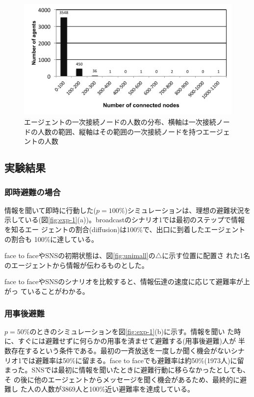\documentclass[a4j]{jarticle}
\begin{document}
\begin{figure}[t]
  \centering
  \includegraphics[width=\linewidth]{fig/number-of-friends.pdf}
\caption{エージェントの一次接続ノードの人数の分布、横軸は一次接続ノードの人数の範囲、縦軸はその範囲の一次接続ノードを持つエージェ
 ントの人数}
  \label{fig:friends-graph}
\end{figure}


\subsection{実験結果}
\subsubsection{即時避難の場合}
情報を聞いて即時に行動した($p=100\%$)シミュレーションは、理想の避難状況を
示している(図\ref{fig:exp-1}(a))。broadcastのシナリオ1では最初のステップで情報を知るエー
ジェントの割合(diffusion)は100\%で、出口に到着したエージェントの割合も
100\%に達している。

face to faceやSNSの初期状態は、図\ref{fig:unimall}の$\triangle$に示す位置に配置さ
れた1名のエージェントから情報が伝わるものとした。

face to faceやSNSのシナリオを比較すると、情報伝達の速度に応じて避難率が上がっ
ていることがわかる。

\subsubsection{用事後避難}
$p=50\%$のときのシミュレーションを図\ref{fig:exp-1}(b)に示す。情報を聞い
た時に、すぐには避難せずに何らかの用事を済ませて避難する(用事後避難)人が
半数存在するという条件である。最初の一斉放送を一度しか聞く機会がないシナ
リオ1では避難率は50\%に留まる。face to faceでも避難率は約50\%(1973人)に留
まった。SNSでは最初に情報を聞いたときに避難行動に移らなかったとしても、そ
の後に他のエージェントからメッセージを聞く機会があるため、最終的に避難し
た人の人数が3869人と100\%近い避難率を達成している。
\end{document}
